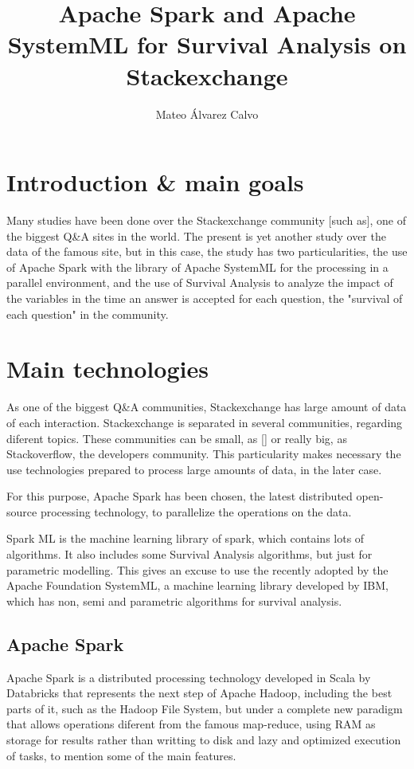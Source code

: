 \documentclass[11pt]{article} %
\title{Apache Spark and Apache SystemML for Survival Analysis on Stackexchange}
\author{Mateo Álvarez Calvo}
\begin{document}
\maketitle


\section*{Introduction \& main goals}

Many studies have been done over the Stackexchange community [such as], one of the biggest Q\&A sites in the world. The present is yet another study over the data of the famous site, but in this case, the study has two particularities, the use of Apache Spark with the library of Apache SystemML for the processing in a parallel environment, and the use of Survival Analysis to analyze the impact of the variables in the time an answer is accepted for each question, the "survival of each question" in the community.

\section{Main technologies}

As one of the biggest Q\&A communities, Stackexchange has large amount of data of each interaction.
Stackexchange is separated in several communities, regarding diferent topics. These communities can be small, as [] or really big, as Stackoverflow, the developers community. This particularity makes necessary the use technologies prepared to process large amounts of data, in the later case.

For this purpose, Apache Spark has been chosen, the latest distributed open-source processing technology, to parallelize the operations on the data.

Spark ML is the machine learning library of spark, which contains lots of algorithms. It also includes some Survival Analysis algorithms, but just for parametric modelling. This gives an excuse to use the recently adopted by the Apache Foundation SystemML, a machine learning library developed by IBM, which has non, semi and parametric algorithms for survival analysis.


\subsection{Apache Spark}

Apache Spark is a distributed processing technology developed in Scala by Databricks that represents the next step of Apache Hadoop, including the best parts of it, such as the Hadoop File System, but under a complete new paradigm that allows operations diferent from the famous map-reduce, using RAM as storage for results rather than writting to disk and lazy and optimized execution of tasks, to mention some of the main features.
\end{document}
